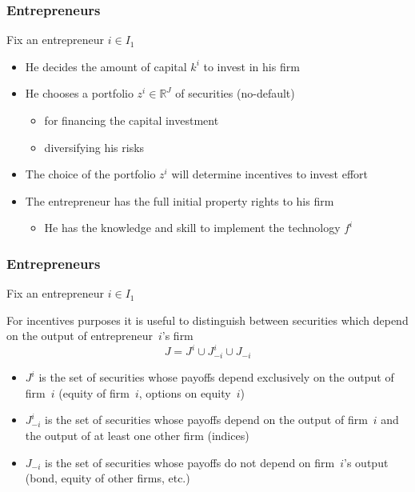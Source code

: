 \documentclass[blue]{beamer}
\def\R{\mathbb{R}}
\theoremstyle{definition}
\theoremstyle{example}
\begin{document}
\begin{frame}\frametitle{Entrepreneurs}

Fix an entrepreneur $i\in I_1$
\begin{itemize}
\item He decides the amount of capital $k^i$ to invest in his firm
\item He chooses a portfolio $z^i \in \R^J$ of securities (no-default)
    \begin{itemize}
    \item for financing the capital investment
    \item diversifying his risks
    \end{itemize}
\item The choice of the portfolio $z^i$ will determine incentives to invest effort
\item The entrepreneur has the full initial property rights to his firm
    \begin{itemize}
    \item He has the knowledge and skill to implement the technology $f^i$
    \end{itemize}
\end{itemize}

\end{frame}



\begin{frame}\frametitle{Entrepreneurs}

Fix an entrepreneur $i\in I_1$

For incentives purposes it is useful to distinguish between securities which depend on the output of entrepreneur~$i$'s firm
\[
J = J^i \cup J^i_{-i} \cup J_{-i}
\]

\begin{itemize}
\item $J^i$ is the set of securities whose payoffs depend exclusively on the output of firm~$i$ (equity of firm~$i$, options on equity~$i$)
\item $J^i_{-i}$ is the set of securities whose payoffs depend on the output of firm~$i$ and the output of at least one other firm (indices)
\item $J_{-i}$ is the set of securities whose payoffs do not depend on firm~$i$'s output (bond, equity of other firms, etc.)
\end{itemize}

\end{frame}
\end{document}
